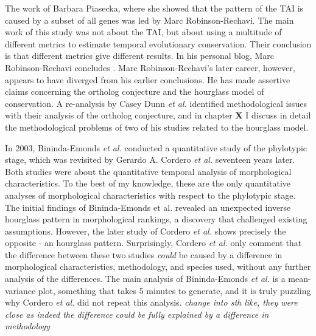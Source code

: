 The work of Barbara Piasecka, where she showed that the pattern of the TAI is caused by a subset of all genes was led by Marc Robinson-Rechavi. The main work of this study was not about the TAI, but about using a multitude of different metrics to estimate temporal evolutionary conservation. Their conclusion is that different metrics give different results. In his personal blog, Marc Robinson-Rechavi concludes \cite{robinsonrechaviblog}. Marc Robinson-Rechavi's later career, however, appears to have diverged from his earlier conclusions. He has made assertive claims concerning the ortholog conjecture\cite{KryuchkovaMostacci2016} and the hourglass model of conservation\cite{Liu2020,Liu2021,marletaz2018}. A re-analysis by Casey Dunn \textit{et al.} identified methodological issues with their analysis of the ortholog conjecture\cite{Dunn2018}, and in chapter \textbf{X} I discuss in detail the methodological problems of two of his studies related to the hourglass model.

In 2003, Bininda-Emonds \textit{et al.} conducted a quantitative study of the phylotypic stage, which was revisited by Gerardo A. Cordero \textit{et al.} seventeen years later\cite{OlafRP2003, Cordero2020}. Both studies were about the quantitative temporal analysis of morphological characteristics. To the best of my knowledge, these are the only quantitative analyses of morphological characteristics with respect to the phylotypic stage. The initial findings of Bininda-Emonds et al. revealed an unexpected inverse hourglass pattern in morphological rankings, a discovery that challenged existing assumptions. However, the later study of Cordero \textit{et al.} shows precisely the opposite - an hourglass pattern. Surprisingly, Cordero \textit{et al.} only comment that the difference between these two studies \textit{could} be caused by a difference in morphological characteristics, methodology, and species used, without any further analysis of the differences. The main analysis of Bininda-Emonds \textit{et al.} is a mean-variance plot, something that takes 5 minutes to generate, and it is truly puzzling why Cordero \textit{et al.} did not repeat this analysis. \textit{change into sth like, they were close as indeed the difference could be fully explained by a difference in methodology}

